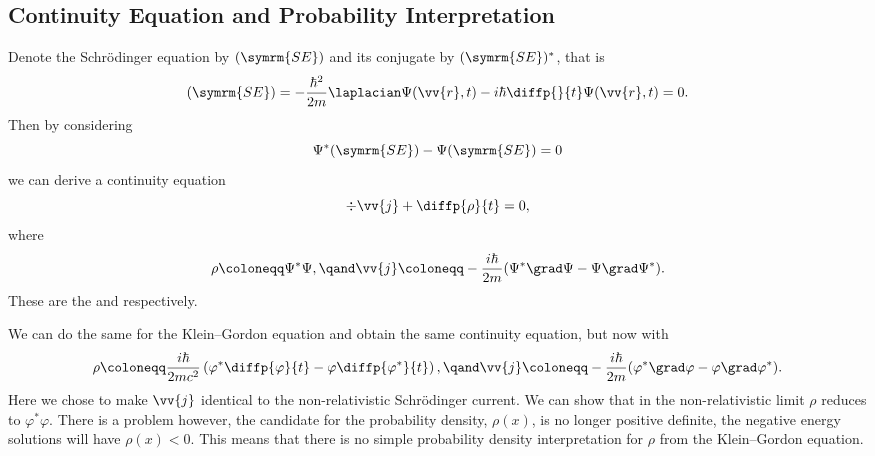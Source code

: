 \documentclass[fleqn]{NotesClass}
\begin{document}
\begin{appendices}
        \subsection{Continuity Equation and Probability Interpretation}
        Denote the Schrödinger equation by \((\symrm{SE})\) and its conjugate by \((\symrm{SE})^*\), that is
        \begin{equation}
            (\symrm{SE}) = -\frac{\hbar^2}{2m} \laplacian \Psi(\vv{r}, t) - i\hbar\diffp{}{t}\Psi(\vv{r}, t) = 0.
        \end{equation}
        Then by considering
        \begin{equation}
            \Psi^*(\symrm{SE}) - \Psi(\symrm{SE}) = 0
        \end{equation}
        we can derive a continuity equation
        \begin{equation}
            \div\vv{j} + \diffp{\rho}{t} = 0,
        \end{equation}
        where
        \begin{equation}
            \rho \coloneqq \Psi^*\Psi, \qand \vv{j} \coloneqq -\frac{i\hbar}{2m} (\Psi^*\grad \Psi - \Psi \grad \Psi^*).
        \end{equation}
        These are the  and  respectively.
        
        We can do the same for the Klein--Gordon equation and obtain the same continuity equation, but now with
        \begin{equation}
            \rho \coloneqq \frac{i\hbar}{2mc^2} \left( \varphi^* \diffp{\varphi}{t} - \varphi \diffp{\varphi^*}{t} \right), \qand \vv{j} \coloneqq -\frac{i\hbar}{2m}(\varphi^*\grad \varphi - \varphi\grad\varphi^*).
        \end{equation}
        Here we chose to make \(\vv{j}\) identical to the non-relativistic Schrödinger current.
        We can show that in the non-relativistic limit \(\rho\) reduces to \(\varphi^*\varphi\).
        There is a problem however, the candidate for the probability density, \(\rho(x)\), is no longer positive definite, the negative energy solutions will have \(\rho(x) < 0\).
        This means that there is no simple probability density interpretation for \(\rho\) from the Klein--Gordon equation.
        

\end{appendices}
\end{document}
